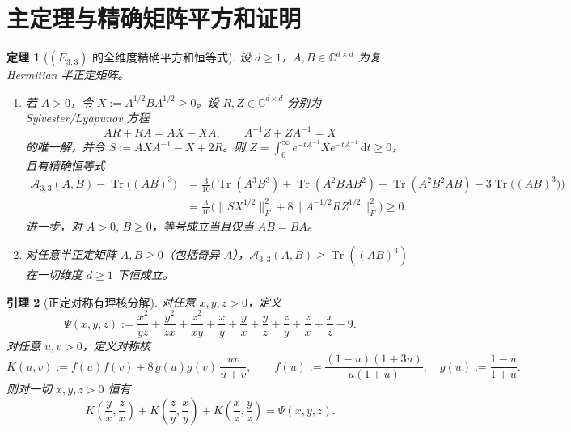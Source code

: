 \documentclass[11pt,a4paper]{article}
\newtheorem{theorem}{定理}
\newtheorem{lemma}[theorem]{引理}
\theoremstyle{remark}
\newcommand{\Tr}{\operatorname{Tr}}
\begin{document}
\section{主定理与精确矩阵平方和证明}

\begin{theorem}[$(E_{3,3})$ 的全维度精确平方和恒等式]\label{thm:main}
设 $d \ge 1$，$A, B \in \mathbb{C}^{d\times d}$ 为复 Hermitian 半正定矩阵。
\begin{enumerate}
  \item 若 $A > 0$，令 $X := A^{1/2} B A^{1/2} \ge 0$。设 $R, Z \in \mathbb{C}^{d\times d}$ 分别为 Sylvester/Lyapunov 方程
  \begin{equation}\label{eq:lyap}
    A R + R A = A X - X A, \qquad A^{-1} Z + Z A^{-1} = X
  \end{equation}
  的唯一解，并令 $S := A X A^{-1} - X + 2R$。则 $Z = \int_0^\infty e^{-t A^{-1}} X e^{-t A^{-1}}\,\mathrm{d}t \ge 0$，且有精确恒等式
  \begin{align}
    \mathcal{A}_{3,3}(A,B) - \Tr\!\big((AB)^3\big)
    &= \frac{3}{10}\Big(\Tr(A^3 B^3) + \Tr(A^2 B A B^2) + \Tr(A^2 B^2 A B) - 3\Tr\!\big((AB)^3\big)\Big) \nonumber \\
    &= \frac{3}{10}\Big(\big\|S X^{1/2}\big\|_F^2 + 8\big\|A^{-1/2} R Z^{1/2}\big\|_F^2\Big) \ge 0. \label{eq:sos}
  \end{align}
  进一步，对 $A > 0,\, B \ge 0$，等号成立当且仅当 $AB = BA$。
  \item 对任意半正定矩阵 $A, B \ge 0$（包括奇异 $A$），$\mathcal{A}_{3,3}(A,B) \ge \Tr((AB)^3)$ 在一切维度 $d\ge 1$ 下恒成立。
\end{enumerate}
\end{theorem}

\begin{lemma}[正定对称有理核分解]\label{lem:kernel}
对任意 $x, y, z > 0$，定义
\[
\Psi(x,y,z) := \frac{x^2}{yz} + \frac{y^2}{zx} + \frac{z^2}{xy} + \frac{x}{y} + \frac{y}{x} + \frac{y}{z} + \frac{z}{y} + \frac{z}{x} + \frac{x}{z} - 9.
\]
对任意 $u, v > 0$，定义对称核
\[
K(u,v) := f(u)f(v) + 8\,g(u)g(v)\,\frac{uv}{u+v}, \qquad
f(u) := \frac{(1-u)(1+3u)}{u(1+u)}, \quad g(u) := \frac{1-u}{1+u}.
\]
则对一切 $x, y, z > 0$ 恒有
\begin{equation}\label{eq:kernel}
  K\!\left(\frac{y}{x}, \frac{z}{x}\right) + K\!\left(\frac{z}{y}, \frac{x}{y}\right) + K\!\left(\frac{x}{z}, \frac{y}{z}\right) = \Psi(x,y,z).
\end{equation}
\end{lemma}
\end{document}
